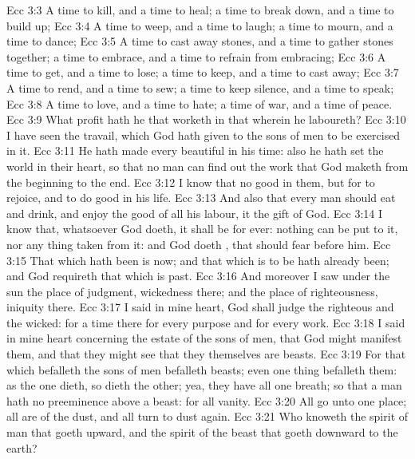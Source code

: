 \vs Ecc 3:3 A time to kill, and a time to heal; a time to break down, and a time to build up;
\vs Ecc 3:4 A time to weep, and a time to laugh; a time to mourn, and a time to dance;
\vs Ecc 3:5 A time to cast away stones, and a time to gather stones together; a time to embrace, and a time to refrain from embracing;
\vs Ecc 3:6 A time to get, and a time to lose; a time to keep, and a time to cast away;
\vs Ecc 3:7 A time to rend, and a time to sew; a time to keep silence, and a time to speak;
\vs Ecc 3:8 A time to love, and a time to hate; a time of war, and a time of peace.
\vs Ecc 3:9 What profit hath he that worketh in that wherein he laboureth?
\vs Ecc 3:10 I have seen the travail, which God hath given to the sons of men to be exercised in it.
\vs Ecc 3:11 He hath made every  beautiful in his time: also he hath set the world in their heart, so that no man can find out the work that God maketh from the beginning to the end.
\vs Ecc 3:12 I know that  no good in them, but for  to rejoice, and to do good in his life.
\vs Ecc 3:13 And also that every man should eat and drink, and enjoy the good of all his labour, it  the gift of God.
\vs Ecc 3:14 I know that, whatsoever God doeth, it shall be for ever: nothing can be put to it, nor any thing taken from it: and God doeth , that  should fear before him.
\vs Ecc 3:15 That which hath been is now; and that which is to be hath already been; and God requireth that which is past.
\vs Ecc 3:16 And moreover I saw under the sun the place of judgment,  wickedness  there; and the place of righteousness,  iniquity  there.
\vs Ecc 3:17 I said in mine heart, God shall judge the righteous and the wicked: for  a time there for every purpose and for every work.
\vs Ecc 3:18 I said in mine heart concerning the estate of the sons of men, that God might manifest them, and that they might see that they themselves are beasts.
\vs Ecc 3:19 For that which befalleth the sons of men befalleth beasts; even one thing befalleth them: as the one dieth, so dieth the other; yea, they have all one breath; so that a man hath no preeminence above a beast: for all  vanity.
\vs Ecc 3:20 All go unto one place; all are of the dust, and all turn to dust again.
\vs Ecc 3:21 Who knoweth the spirit of man that goeth upward, and the spirit of the beast that goeth downward to the earth?
